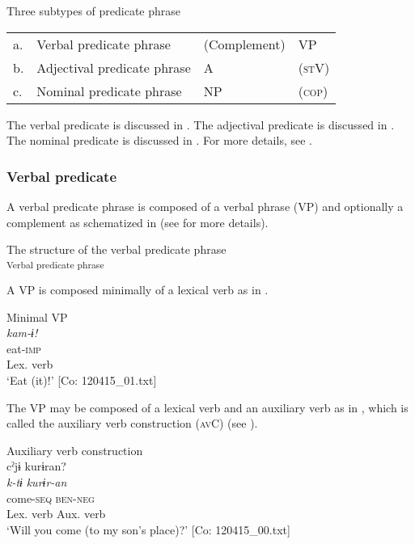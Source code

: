 \ea Three subtypes of predicate phrase\\\label{ex:4.4}
\begin{tabular}{@{}l@{ }lll@{}}
  a. & Verbal predicate phrase     & (Complement) &  VP\footnotemark[1] \\
  b. & Adjectival predicate phrase &    A\footnotemark[2]         & (\textsc{st}V\footnotemark[3])\\
  c. & Nominal predicate phrase    &  NP          & (\textsc{cop}\footnotemark[4])\\
\end{tabular}
\z
{}

The verbal predicate is discussed in . The adjectival predicate is discussed in . The nominal predicate is discussed in . For more details, see .

\subsubsection{Verbal predicate}\label{sec:4.1.3.1}

A verbal predicate phrase is composed of a verbal phrase (VP) and optionally a complement as schematized in  (see  for more details).

\ea\label{ex:4.5}  The structure of the verbal predicate phrase\\\textsubscript{Verbal predicate phrase}
\z

A VP is composed minimally of a lexical verb as in .

\ea\label{ex:4.6}  Minimal VP\\
    \glll \textit{kam-ɨ!}\\
    eat-\textsc{imp}\\
    {Lex. verb}\\
    \glt     ‘Eat (it)!’   [Co: 120415\_01.txt]
\z

The VP may be composed of a lexical verb and an auxiliary verb as in , which is called the auxiliary verb construction (\textsc{av}C) (see ).

\ea\label{ex:4.7}Auxiliary verb construction\\
    \gllll cˀjɨ  kurɨran?\\
    \textit{k-tɨ}  \textit{kurɨr-an}\\
    come-\textsc{seq}  \textsc{ben}-\textsc{neg}\\
    {Lex. verb}  {Aux. verb}\\
    \glt     ‘Will you come (to my son’s place)?’    [Co: 120415\_00.txt]
\z

